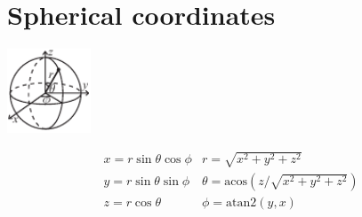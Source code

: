 \section{Spherical coordinates}
	\begin{center}
	\includegraphics[width=25mm]{content/geometry/sphericalCoordinates}
	\end{center}	
	\[
	\begin{array}{cc}
	x = r\sin\theta\cos\phi & r = \sqrt{x^2+y^2+z^2}\\
	y = r\sin\theta\sin\phi & \theta = \textrm{acos}(z/\sqrt{x^2+y^2+z^2})\\
	z = r\cos\theta & \phi = \textrm{atan2}(y,x)
	\end{array}
	\]
